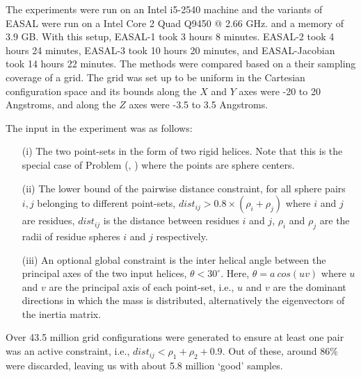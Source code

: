 The experiments were run on an Intel i5-2540 machine and the variants of
EASAL were run on a Intel Core 2 Quad Q9450 @ 2.66 GHz. and a memory of 3.9 GB.
With this setup, EASAL-1 took 3 hours 8 minutes. EASAL-2 took 4 hours 24
minutes, EASAL-3 took 10 hours 20 minutes, and EASAL-Jacobian took 14 hours 22
minutes. The methods were compared based on a their sampling coverage of a
grid. The grid was set up to be uniform in the Cartesian configuration space
and its bounds along the $X$ and $Y$ axes were -20 to 20 Angstroms, and along
the $Z$ axes were -3.5 to 3.5 Angstroms.

The input in the experiment was as follows:

\begin{enumerate}
\item[(i)] The two point-sets in the form of two rigid helices. Note that this
is the special case of Problem (\cone, \ctwo) where the points are sphere centers.

\item[(ii)] The lower bound of the pairwise distance constraint, for
all sphere pairs $i, j$ belonging to different point-sets, $dist_{ij} > 0.8 \times (\rho_i
+\rho_j)$ where $i$ and $j$ are residues, $dist_{ij}$ is the distance between
residues $i$ and $j$, $\rho_i$ and $\rho_j$ are the radii of residue spheres $i$ and
$j$ respectively.

\item[(iii)] An optional global constraint 
is the inter helical angle between the principal axes of
the two input helices, $\theta < 30^{\circ}$. Here, $\theta = a~cos(uv)$
where $u$ and $v$ are the principal axis of each point-set, i.e., $u$ and $v$
are the dominant directions in which the mass is distributed, alternatively the
eigenvectors of the inertia matrix. 

\end{enumerate}


Over 43.5 million grid configurations were generated to ensure at least one pair
was an active constraint, i.e., $dist_{ij} < \rho_1 + \rho_2 + 0.9$. Out of these, around
86\% were discarded, leaving us with about 5.8 million `good' samples.

